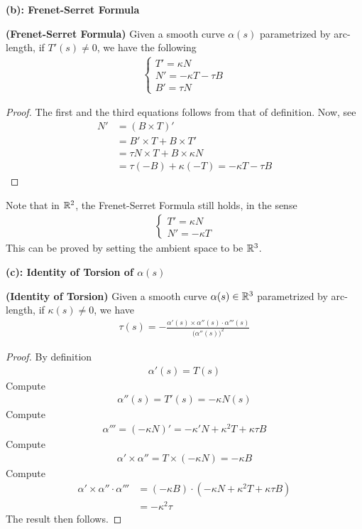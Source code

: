 \documentclass{report}
\begin{document}
\textbf{(b): Frenet-Serret Formula}
\begin{theorem}
\textbf{(Frenet-Serret Formula)} Given a smooth curve $\alpha(s)$ parametrized by arc-length, if $T'(s)\neq 0$, we have the following  
\begin{align*}
\begin{cases}
  T'=\kappa N\\
  N'=-\kappa T-\tau B\\
  B'=\tau N
\end{cases}
\end{align*}
\end{theorem}
\begin{proof}
The first and the third equations follows from that of definition. Now, see 
\begin{align*}
N'&=(B\times T)'\\
&=B' \times T +  B \times T'\\
&=\tau N \times T + B \times \kappa N\\
&=\tau (-B)+ \kappa (-T)=-\kappa T-\tau B
\end{align*}

\end{proof}
\begin{mdframed}
Note that in $\mathbb{R}^2$, the Frenet-Serret Formula still holds, in the sense 
 \begin{align*}
\begin{cases}
  T'=\kappa N\\
  N'= -\kappa T
\end{cases}
\end{align*}
This can be proved by setting the ambient space to be $\mathbb{R}^3$. 
\end{mdframed}
\textbf{(c): Identity of Torsion of $\alpha(s) $}
\begin{theorem}
\textbf{(Identity of Torsion)} Given a smooth curve $\alpha (s)\in\mathbb{R}^3$ parametrized by arc-length, if $\kappa(s)\neq 0$, we have 
\begin{align*}
\tau (s)=-\frac{\alpha ' (s)\times \alpha ''(s)\cdot \alpha '''(s)}{\big(\alpha ''(s) \big)^2}
\end{align*}
\end{theorem}
\begin{proof}
By definition 
\begin{align*}
\alpha '(s)=T(s)
\end{align*}
Compute 
\begin{align*}
\alpha ''(s)=T'(s)= -\kappa N (s)
\end{align*}
Compute 
\begin{align*}
\alpha '''= (-\kappa N)'=-\kappa ' N+ \kappa^2 T +\kappa \tau B
\end{align*}
Compute 
\begin{align*}
\alpha' \times \alpha '' = T \times (- \kappa N)=-\kappa B
\end{align*}
Compute 
\begin{align*}
\alpha ' \times \alpha '' \cdot \alpha '''&=(-\kappa B)\cdot (-\kappa N+\kappa^2 T + \kappa \tau B)\\
&= -\kappa^2 \tau 
\end{align*}
The result then follows. 
\end{proof}
\end{document}
